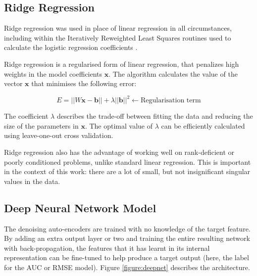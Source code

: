 \documentclass{article}
\begin{document}
\subsection{Ridge Regression}

Ridge regression was used in place of linear regression in all circumstances, including within the Iteratively Reweighted Least Squares routines used to calculate the logistic regression coefficients \cite{komarek2005}.

Ridge regression is a regularised form of linear regression, that penalizes high weights in the model coefficients $\mathbf{x}$.  The algorithm calculates the value of the vector $\mathbf{x}$ that minimises the following error:

\begin{equation}
  E = ||W\mathbf{x} - \mathbf{b}|| + \lambda ||\mathbf{b}||^2 \leftarrow \mbox{Regularisation term}
\end{equation}

The coefficient $\lambda$ describes the trade-off between fitting the data and reducing the size of the parameters in $\mathbf{x}$.  The optimal value of $\lambda$ can be efficiently calculated using leave-one-out cross validation.

Ridge regression also has the advantage of working well on rank-deficient or poorly conditioned problems, unlike standard linear regression.  
This is important in the context of this work: there are a lot of small, but not insignificant singular values in the data. 

\subsection{Deep Neural Network Model}

The denoising auto-encoders are trained with no knowledge of the target feature.
By adding an extra output layer or two and training the entire resulting network with back-propagation, the features that it has learnt in its internal representation can be fine-tuned to help produce a target output (here, the label for the AUC or RMSE model).  Figure \ref{figure:deepnet} describes the architecture.
\end{document}
